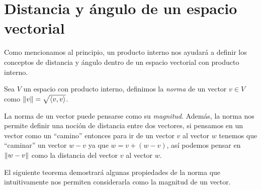 \section{Distancia y ángulo de un espacio vectorial}

Como mencionamos al principio, un producto interno nos ayudará a definir los conceptos de distancia y ángulo dentro de un espacio vectorial con producto interno.

\begin{defi}
  Sea $V$ un espacio con producto interno, definimos la \emph{norma} de un vector $v \in V$ como $\mathopen\|v\mathclose\| = \sqrt{\langle v,v\rangle}$.
\end{defi}

La norma de un vector puede pensarse como su \emph{magnitud}. Además, la norma nos permite definir una noción de distancia entre dos vectores, si pensamos en un vector como un ``camino'' entonces para ir de un vector $v$ al vector $w$ tenemos que ``caminar'' un vector $w-v$ ya que $w = v + (w-v)$, así podemos pensar en $\mathopen\|w-v\mathclose\|$ como la distancia del vector $v$ al vector $w$.

El siguiente teorema demostrará algunas propiedades de la norma que intuitivamente nos permiten considerarla como la magnitud de un vector.

